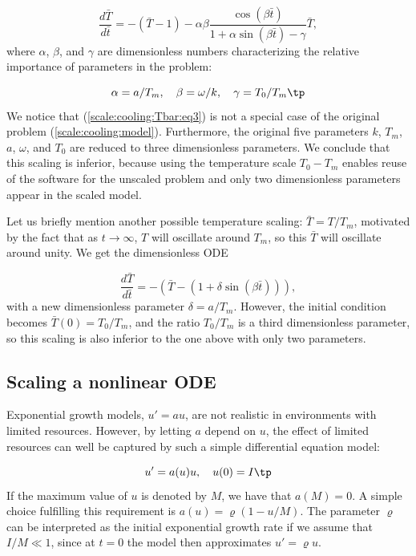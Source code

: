 \documentclass[graybox,envcountchap,sectrefs,final]{svmonodo}
\begin{document}
\begin{equation}
\frac{d\bar T}{d\bar t} = -(\bar T - 1) -
\alpha\beta \frac{\cos(\beta \bar t)}{1 + \alpha\sin(\beta\bar t) - \gamma}
\bar T,
\label{scale:cooling:Tbar:eq3}
\end{equation}
where $\alpha$, $\beta$, and $\gamma$ are dimensionless numbers
characterizing the relative importance of parameters in the problem:

\begin{equation}
\alpha=a/T_m,\quad \beta = \omega/k,\quad \gamma = T_0/T_m
\tp
\end{equation}
We notice that (\ref{scale:cooling:Tbar:eq3})
is not a special case of the original problem
(\ref{scale:cooling:model}). Furthermore, the original five
parameters $k$, $T_m$, $a$, $\omega$, and
$T_0$ are reduced to three dimensionless parameters.
We conclude that this scaling is inferior, because
using the temperature scale $T_0-T_m$ enables reuse of the software
for the unscaled problem and only two dimensionless parameters appear
in the scaled model.

Let us briefly mention another possible temperature scaling:
$\bar T = T/T_m$, motivated by the fact that as $t\rightarrow\infty$,
$T$ will oscillate around $T_m$, so this $\bar T$ will oscillate around
unity. We get the dimensionless ODE

\[ \frac{d\bar T}{d\bar t} = -(\bar T - (1 + \delta\sin(\beta\bar t))),\]
with a new dimensionless parameter $\delta = a/T_m$. However, the initial
condition becomes $\bar T(0)=T_0/T_m$, and the ratio $T_0/T_m$ is
a third dimensionless parameter, so this scaling is also inferior to the
one above with only two parameters.

\subsection{Scaling a nonlinear ODE}
\label{sec:scale:nonlinear}


Exponential growth models, $u'=au$, are not realistic in environments
with limited resources. However, by letting $a$ depend on $u$, the effect
of limited resources can well be captured by such a simple differential
equation model:

\begin{equation}
u' = a(u)u,\quad u(0)=I\tp
\label{sec:scale:nonlinear:model1}
\end{equation}
If the maximum value of $u$ is denoted by $M$, we have that $a(M)=0$.
A simple choice fulfilling this requirement is $a(u)=\varrho(1-u/M)$.
The parameter $\varrho$ can be interpreted as the initial exponential
growth rate if we assume that $I/M\ll 1$, since at $t=0$ the model then
approximates $u'=\varrho u$.
\end{document}
